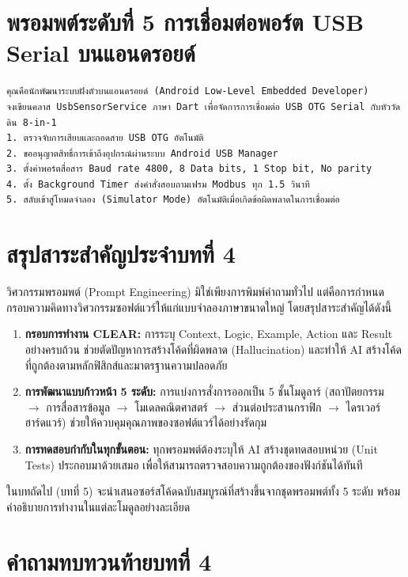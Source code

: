 \section{พรอมพต์ระดับที่ 5 การเชื่อมต่อพอร์ต USB Serial บนแอนดรอยด์}

\begin{promptbox}
\begin{lstlisting}
คุณคือนักพัฒนาระบบฝังตัวบนแอนดรอยด์ (Android Low-Level Embedded Developer)
จงเขียนคลาส UsbSensorService ภาษา Dart เพื่อจัดการการเชื่อมต่อ USB OTG Serial กับหัววัดดิน 8-in-1
1. ตรวจจับการเสียบและถอดสาย USB OTG อัตโนมัติ
2. ขออนุญาตสิทธิ์การเข้าถึงอุปกรณ์ผ่านระบบ Android USB Manager
3. ตั้งค่าพอร์ตสื่อสาร Baud rate 4800, 8 Data bits, 1 Stop bit, No parity
4. ตั้ง Background Timer ส่งคำสั่งสอบถามเฟรม Modbus ทุก 1.5 วินาที
5. สลับเข้าสู่โหมดจำลอง (Simulator Mode) อัตโนมัติเมื่อเกิดข้อผิดพลาดในการเชื่อมต่อ
\end{lstlisting}
\end{promptbox}

\section{สรุปสาระสำคัญประจำบทที่ 4}

วิศวกรรมพรอมพต์ (Prompt Engineering) มิใช่เพียงการพิมพ์คำถามทั่วไป แต่คือการกำหนดกรอบความคิดทางวิศวกรรมซอฟต์แวร์ให้แก่แบบจำลองภาษาขนาดใหญ่ โดยสรุปสาระสำคัญได้ดังนี้
\begin{enumerate}
    \item \textbf{กรอบการทำงาน CLEAR:} การระบุ Context, Logic, Example, Action และ Result อย่างครบถ้วน ช่วยตัดปัญหาการสร้างโค้ดที่ผิดพลาด (Hallucination) และทำให้ AI สร้างโค้ดที่ถูกต้องตามหลักฟิสิกส์และมาตรฐานความปลอดภัย
    \item \textbf{การพัฒนาแบบก้าวหน้า 5 ระดับ:} การแบ่งการสั่งการออกเป็น 5 ชั้นโมดูลาร์ (สถาปัตยกรรม $\rightarrow$ การสื่อสารข้อมูล $\rightarrow$ โมเดลคณิตศาสตร์ $\rightarrow$ ส่วนต่อประสานกราฟิก $\rightarrow$ ไดรเวอร์ฮาร์ดแวร์) ช่วยให้ควบคุมคุณภาพของซอฟต์แวร์ได้อย่างรัดกุม
    \item \textbf{การทดสอบกำกับในทุกขั้นตอน:} ทุกพรอมพต์ต้องระบุให้ AI สร้างชุดทดสอบหน่วย (Unit Tests) ประกอบมาด้วยเสมอ เพื่อให้สามารถตรวจสอบความถูกต้องของฟังก์ชันได้ทันที
\end{enumerate}

ในบทถัดไป (บทที่ 5) จะนำเสนอซอร์สโค้ดฉบับสมบูรณ์ที่สร้างขึ้นจากชุดพรอมพต์ทั้ง 5 ระดับ พร้อมคำอธิบายการทำงานในแต่ละโมดูลอย่างละเอียด

\section*{คำถามทบทวนท้ายบทที่ 4}

